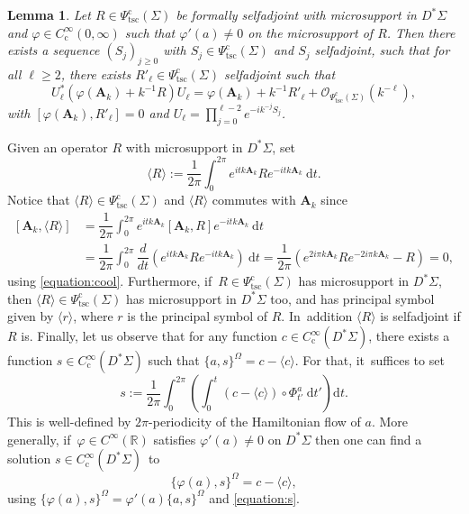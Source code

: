 \documentclass[JEP,XML,SOM,Unicode,published]{cedram}
\newcommand{\bA}{\boldsymbol{A}}
\theoremstyle{plain}
\newtheorem{lemma}[theorem]{Lemma}
\theoremstyle{definition}
\let\mc\mathcal
\newcommand{\R}{\mathbb{R}}
\newcommand{\dd}{\mathrm{d}}
\DeclareMathOperator{\comp}{c}
\begin{document}
\begin{lemma}
\label{lemma:normal-form}
Let $R \in \Psi^{{\comp}}_{\mathrm{tsc}}(\Sigma)$ be formally
selfadjoint with microsupport in $D^*\Sigma$ and $\varphi \in
C^\infty_{{\comp}}(0,\infty)$ such that $\varphi'(a) \neq 0$ on the microsupport of $R$.
Then there exists a sequence $(S_j)_{j \geq 0}$ with $S_j \in
\Psi^{{\comp}}_{\mathrm{tsc}}(\Sigma)$ and $S_j$ selfadjoint, such that
for all $\ell \geq 2$, there exists $R'_\ell \in
\Psi^{{\comp}}_{\mathrm{tsc}}(\Sigma)$ selfadjoint such that
\begin{equation}
\label{equation:prod}
U_{\ell}^* (\varphi(\bA_k) + k^{-1}R) U_{\ell}
= \varphi(\bA_k) + k^{-1}R'_\ell + \mc{O}_{\Psi_{\mathrm{tsc}}^{{\comp}}(\Sigma)}(k^{-\ell}),
\end{equation}
with $[\varphi(\bA_k),R'_\ell]=0$ and $U_{\ell} = \prod_{j=0}^{\ell-2}
e^{-ik^{-j}S_j}$.
\end{lemma}

Given an operator $R$ with microsupport in $D^*\Sigma$, set
\[
\langle R\rangle := \dfrac{1}{2\pi} \int_0^{2\pi} e^{itk\bA_k} R e^{-itk\bA_k} ~ \dd t.
\]
Notice that $\langle R\rangle \in \Psi^{\comp}_{\mathrm{tsc}}(\Sigma)$ and $\langle R \rangle$ commutes with $\bA_k$ since
\[
\begin{split}
[\bA_k, \langle R \rangle ] &= \dfrac{1}{2\pi} \int_0^{2\pi} e^{itk\bA_k} [\bA_k,R]e^{-itk\bA_k} ~ \dd t \\
& = \dfrac{1}{2\pi} \int_0^{2\pi} \dfrac{d}{dt} (e^{itk\bA_k} R e^{-itk\bA_k}) ~ \dd t = \dfrac{1}{2\pi}(e^{2i\pi k\bA_k} Re^{-2i \pi k\bA_k}-R) = 0,
\end{split}
\]
using \eqref{equation:cool}. Furthermore, if~$R \in
\Psi_{\mathrm{tsc}}^{\comp}(\Sigma)$ has microsupport in $D^*\Sigma$, then $\langle R\rangle \in
\Psi_{\mathrm{tsc}}^{\comp}(\Sigma)$ has microsupport in $D^*\Sigma$ too, and has principal symbol given by $\langle
r\rangle$, where $r$ is the principal symbol of $R$. In~addition $\langle
R\rangle$ is selfadjoint if $R$ is. Finally, let us observe that for any function $c \in C^\infty_{{\comp}}(D^*\Sigma)$, there exists a function $s \in C^\infty_{{\comp}}(D^*\Sigma)$ such that $\{a,s\}^\Omega = c-\langle c\rangle$. For that, it~suffices to set
\begin{equation}
\label{equation:s}
s := \dfrac{1}{2\pi} \int_0^{2\pi}\left(\int_0^t (c-\langle c\rangle) \circ \Phi_{t'}^a~ \dd t' \right)\dd t.
\end{equation}
This is well-defined by $2\pi$-periodicity of the Hamiltonian flow of $a$.
More generally, if~$\varphi \in C^\infty(\R)$ satisfies $\varphi'(a) \neq 0$ on $D^*\Sigma$ then one can find a solution $s \in C^\infty_{\comp}(D^*\Sigma)$~to
\begin{equation}
\label{equation:resoluble}
\{\varphi(a),s\}^\Omega = c-\langle c\rangle,
\end{equation}
using $\{\varphi(a),s\}^\Omega = \varphi'(a)\{a,s\}^\Omega$ and \eqref{equation:s}.
\end{document}
